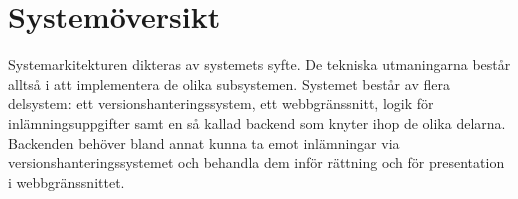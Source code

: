 \section{Systemöversikt}
Systemarkitekturen dikteras av systemets syfte. De tekniska utmaningarna består alltså i att implementera de olika subsystemen. 
Systemet består av flera delsystem: ett versionshanteringssystem, ett webbgränssnitt, logik för inlämningsuppgifter samt en så kallad backend som knyter ihop de olika delarna. Backenden behöver bland annat kunna ta emot inlämningar via versionshanteringssystemet och behandla dem inför rättning och för presentation i webbgränssnittet.
